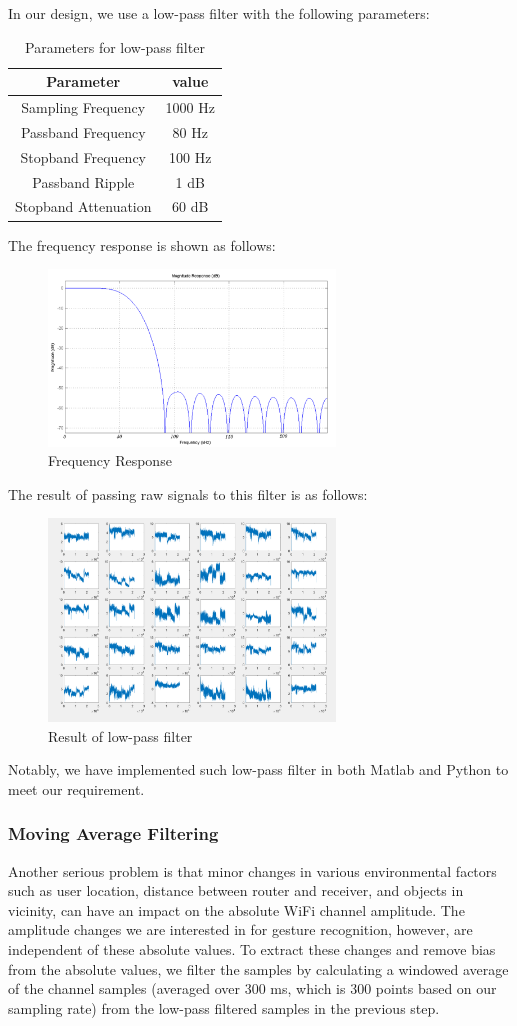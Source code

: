 \documentclass[conference]{IEEEtran}
\begin{document}
In our design, we use a low-pass filter with the following parameters:
\begin{table}[H]
\centering
\begin{tabular}{|c|c|}
\hline
Parameter & value \\
\hline
\hline
Sampling Frequency & 1000 Hz \\
\hline
Passband Frequency & 80 Hz \\
\hline
Stopband Frequency & 100 Hz \\
\hline
Passband Ripple & 1 dB \\
\hline
Stopband Attenuation & 60 dB \\
\hline
\end{tabular}
\caption{Parameters for low-pass filter}
\end{table}

The frequency response is shown as follows:
\begin{figure}[H]
\centering
\includegraphics[width=3in]{FR.png}
\caption{Frequency Response}
\end{figure}
The result of passing raw signals to this filter is as follows:
\begin{figure}[H]
\centering
\includegraphics[width=3in]{LPF.png}
\caption{Result of low-pass filter}
\end{figure}
Notably, we have implemented such low-pass filter in both Matlab and Python to meet our requirement.
\subsubsection{Moving Average Filtering}
Another serious problem is that minor changes in various environmental factors such as user location, distance between router and receiver, and objects in vicinity, can have an impact on the absolute WiFi channel amplitude. The amplitude changes we are interested in for gesture recognition, however, are independent of these absolute values. To extract these changes and remove bias from the absolute values, we filter the samples by calculating a windowed average of the channel samples (averaged over 300 ms, which is 300 points based on our sampling rate) from the low-pass filtered samples in the previous step.
\end{document}
